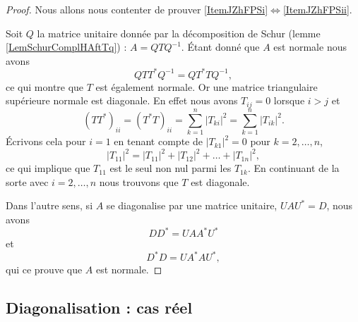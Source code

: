 \begin{proof}
    Nous allons nous contenter de prouver \ref{ItemJZhFPSi}\( \Leftrightarrow\)\ref{ItemJZhFPSii}.

    Soit \( Q\) la matrice unitaire donnée par la décomposition de Schur (lemme \ref{LemSchurComplHAftTq}) : \( A=QTQ^{-1}\). Étant donné que \( A\) est normale nous avons
    \begin{equation}
        QTT^*Q^{-1}=QT^*TQ^{-1},
    \end{equation}
    ce qui montre que \( T\) est également normale. Or une matrice triangulaire supérieure normale est diagonale. En effet nous avons \( T_{ij}=0\) lorsque \( i>j\) et
    \begin{equation}
        (TT^*)_{ii}=(T^*T)_{ii}=\sum_{k=1}^n| T_{ki} |^2=\sum_{k=1}^n| T_{ik} |^2.
    \end{equation}
    Écrivons cela pour \( i=1\) en tenant compte de \( | T_{k1} |^2=0\) pour \( k=2,\ldots, n\),
    \begin{equation}
        | T_{11} |^2=| T_{11} |^2+| T_{12} |^2+\ldots+| T_{1n} |^2,
    \end{equation}
    ce qui implique que \( T_{11}\) est le seul non nul parmi les \( T_{1k}\). En continuant de la sorte avec \( i=2,\ldots, n\) nous trouvons que \( T\) est diagonale.

    Dans l'autre sens, si \( A\) se diagonalise par une matrice unitaire, \( UAU^*=D\), nous avons
    \begin{equation}
        DD^*=UAA^*U^*
    \end{equation}
    et 
    \begin{equation}
        D^*D=UA^*AU^*,
    \end{equation}
    qui ce prouve que \( A\) est normale.
\end{proof}

\subsection{Diagonalisation : cas réel}

